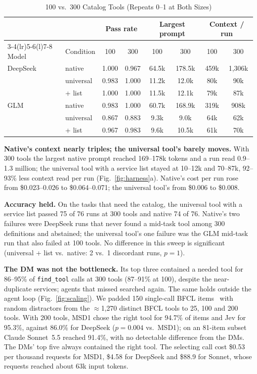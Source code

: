 \documentclass[conference]{IEEEtran}
\newcommand{\msd}{MSD1}
\begin{document}
\begin{table}[t]
\caption{100 vs.\ 300 Catalog Tools (Repeats 0--1 at Both Sizes)}
\label{tab:sweep}
\centering\footnotesize
\setlength{\tabcolsep}{2.6pt}
\begin{tabular}{@{}llcccccc@{}}
\toprule
& & \multicolumn{2}{c}{Pass rate} & \multicolumn{2}{c}{Largest prompt} & \multicolumn{2}{c}{Context / run} \\
\cmidrule(lr){3-4}\cmidrule(lr){5-6}\cmidrule(l){7-8}
Model & Condition & 100 & 300 & 100 & 300 & 100 & 300 \\
\midrule
DeepSeek & native & 1.000 & 0.967 & 64.5k & 178.5k & 459k & 1,306k \\
 & universal & 0.983 & 1.000 & 11.2k & 12.0k & 80k & 90k \\
 & + list & 1.000 & 1.000 & 11.5k & 12.1k & 79k & 87k \\
GLM & native & 0.983 & 1.000 & 60.7k & 168.9k & 319k & 908k \\
 & universal & 0.867 & 0.883 & 9.3k & 9.0k & 64k & 62k \\
 & + list & 0.967 & 0.983 & 9.6k & 10.5k & 61k & 70k \\
\bottomrule
\end{tabular}
\end{table}

\textbf{Native's context nearly triples; the universal tool's barely moves.} With 300 tools the largest native
prompt reached 169--178k tokens and a run read 0.9--1.3 million; the universal tool with a service list stayed
at 10--12k and 70--87k, 92--93\% less context read per run (Fig.~\ref{fig:harness}a). Native's cost per run rose
from \$0.023--0.026 to \$0.064--0.071; the universal tool's from \$0.006 to \$0.008.

\textbf{Accuracy held.} On the tasks that need the catalog, the universal tool with a service list passed 75 of
76 runs at 300 tools and native 74 of 76. Native's two failures were DeepSeek runs that never found a mid-task
tool among 300 definitions and abstained; the universal tool's one failure was the GLM mid-task run that also
failed at 100 tools. No difference in this sweep is significant (universal + list vs.\ native: 2 vs.\ 1
discordant runs, $p=1$).

\textbf{The DM was not the bottleneck.} Its top three contained a needed tool for 86--95\% of
\texttt{find\_tool} calls at 300 tools (87--91\% at 100), despite the near-duplicate services; agents that missed
searched again. The same holds outside the agent loop (Fig.~\ref{fig:scaling}). We padded 150 single-call
BFCL items~\cite{patil2025bfcl} with random distractors from the $\approx$1,270 distinct BFCL tools to 25, 100
and 200 tools. With 200 tools, \msd{} chose the right tool for 94.7\% of items and Jev for 95.3\%, against
86.0\% for DeepSeek ($p=0.004$ vs.\ \msd{}); on an 81-item subset Claude Sonnet~5.5 reached 91.4\%, with no
detectable difference from the DMs. The DMs' top five always contained the right tool. The selecting call cost
\$0.53 per thousand requests for \msd{}, \$4.58 for DeepSeek and \$88.9 for Sonnet, whose requests reached about
63k input tokens.
\end{document}
